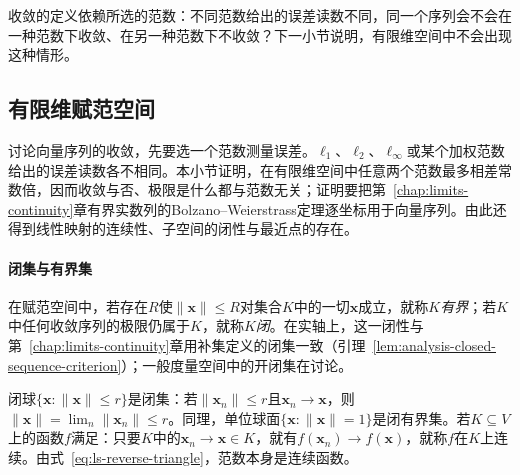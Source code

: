 收敛的定义依赖所选的范数：不同范数给出的误差读数不同，同一个序列会不会在一种范数下收敛、在另一种范数下不收敛？下一小节说明，有限维空间中不会出现这种情形。

\subsection{有限维赋范空间}
\label{sec:ls-finite-dimensional-sequences}
\label{sec:linear-algebra-sequence-convergence}
\label{sec:ls-error-scale-comparison}

讨论向量序列的收敛，先要选一个范数测量误差。$\ell_1$、$\ell_2$、$\ell_\infty$或某个加权范数给出的误差读数各不相同。本小节证明，在有限维空间中任意两个范数最多相差常数倍，因而收敛与否、极限是什么都与范数无关；证明要把第~\ref{chap:limits-continuity}章有界实数列的Bolzano--Weierstrass定理逐坐标用于向量序列。由此还得到线性映射的连续性、子空间的闭性与最近点的存在。

\paragraph{闭集与有界集}
在赋范空间中，若存在$R$使$\lVert\bm x\rVert\leq R$对集合$K$中的一切$\bm x$成立，就称$K$\emph{有界}；若$K$中任何收敛序列的极限仍属于$K$，就称$K$\emph{闭}。在实轴上，这一闭性与第~\ref{chap:limits-continuity}章用补集定义的闭集一致（引理~\ref{lem:analysis-closed-sequence-criterion}）；一般度量空间中的开闭集在讨论。

闭球$\{\bm x:\lVert\bm x\rVert\leq r\}$是闭集：若$\lVert\bm x_n\rVert\leq r$且$\bm x_n\to\bm x$，则$\lVert\bm x\rVert=\lim_n\lVert\bm x_n\rVert\leq r$。同理，单位球面$\{\bm x:\lVert\bm x\rVert=1\}$是闭有界集。若$K\subseteq V$上的函数$f$满足：只要$K$中的$\bm x_n\to\bm x\in K$，就有$f(\bm x_n)\to f(\bm x)$，就称$f$在$K$上连续。由式~\eqref{eq:ls-reverse-triangle}，范数本身是连续函数。

